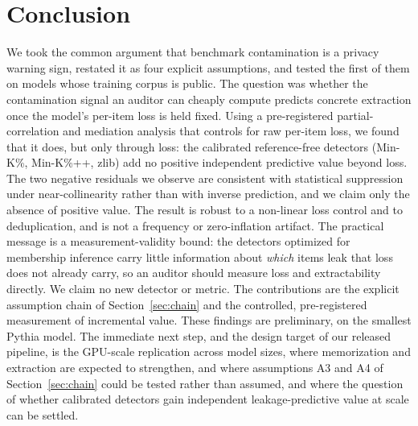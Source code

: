 \section{Conclusion}
\label{sec:conclusion}

We took the common argument that benchmark contamination is a privacy warning sign, restated it as
four explicit assumptions, and tested the first of them on models whose training corpus is public.
The question was whether the contamination signal an auditor can cheaply compute predicts concrete
extraction once the model's per-item loss is held fixed. Using a pre-registered partial-correlation
and mediation analysis that controls for raw per-item loss, we found that it does, but only through
loss: the calibrated reference-free detectors (Min-K\%, Min-K\%++, zlib) add no positive independent
predictive value beyond loss. The two negative residuals we observe are consistent with statistical
suppression under near-collinearity rather than with inverse prediction, and we claim only the
absence of positive value. The result is robust to a non-linear loss control and to deduplication, and is not a frequency
or zero-inflation artifact. The practical message is a measurement-validity bound: the detectors
optimized for membership inference carry little information about \emph{which} items leak that loss
does not already carry, so an auditor should measure loss and extractability directly. We claim no
new detector or metric. The contributions are the explicit assumption chain of
Section~\ref{sec:chain} and the controlled, pre-registered measurement of incremental value. These findings are preliminary, on
the smallest Pythia model. The immediate next step, and the design target of our released
pipeline, is the GPU-scale replication across model sizes, where memorization and extraction are
expected to strengthen, and where assumptions A3 and A4 of Section~\ref{sec:chain} could be tested
rather than assumed, and where the question of whether calibrated detectors gain
independent leakage-predictive value at scale can be settled.
